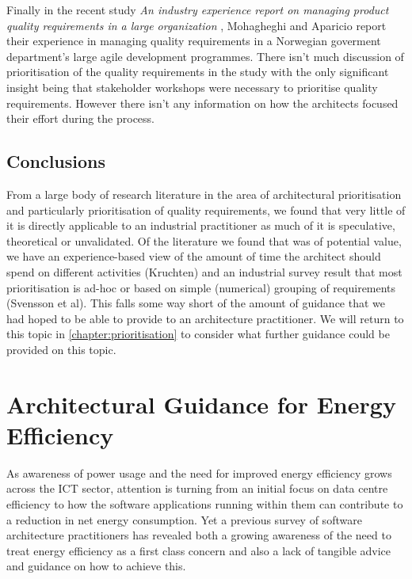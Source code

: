 Finally in the recent study \emph{An industry experience report on managing product quality requirements in a large organization} \cite{mohagheghi2017-managingqr}, Mohagheghi and Aparicio report their experience in managing quality requirements in a Norwegian goverment department's large agile development programmes.  There isn't much discussion of prioritisation of the quality requirements in the study with the only significant insight being that stakeholder workshops were necessary to prioritise quality requirements.  However there isn't any information on how the architects focused their effort during the process.

\subsection{Conclusions}

From a large body of research literature in the area of architectural prioritisation and particularly prioritisation of quality requirements, we found that very little of it is directly applicable to an industrial practitioner as much of it is speculative, theoretical or unvalidated.  Of the literature we found that was of potential value, we have an experience-based view of the amount of time the architect should spend on different activities (Kruchten) and an industrial survey result that most prioritisation is ad-hoc or based on simple (numerical) grouping of requirements (Svensson et al).  This falls some way short of the amount of guidance that we had hoped to be able to provide to an architecture practitioner.  We will return to this topic in \cref{chapter:prioritisation} to consider what further guidance could be provided on this topic.


\section{Architectural Guidance for Energy Efficiency}
\label{section:litreview-energyguidance}


As awareness of power usage and the need for improved energy efficiency grows across the ICT sector, attention is turning from an initial focus on data centre efficiency \cite{delforge2014-datacentreenergy} to how the software applications running within them can contribute to a reduction in net energy consumption.  Yet a previous survey of software architecture practitioners \cite{bashroush2016-datacentreenergy} has revealed both a growing awareness of the need to treat energy efficiency as a first class concern and also a lack of tangible advice and guidance on how to achieve this.

